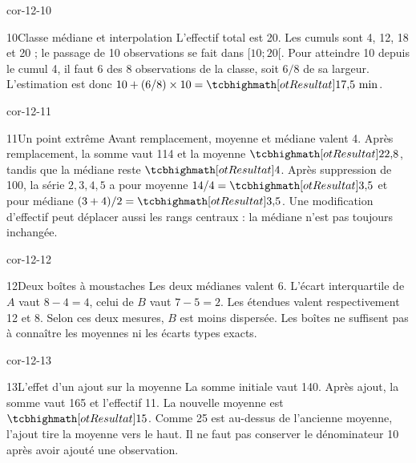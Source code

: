\begin{blocLivre}{cor-12-10}
\begin{corrige}{10}{Classe médiane et interpolation}
L’effectif total est 20. Les cumuls sont 4, 12, 18 et 20 ; le passage de 10 observations se fait dans $[10;20[$. Pour atteindre 10 depuis le cumul 4, il faut 6 des 8 observations de la classe, soit $6/8$ de sa largeur. L’estimation est donc $10+(6/8)\times10=\res{17{,}5\text{ min}}$.
\label{fig-cor-12-10}
\end{corrige}
\end{blocLivre}
\begin{blocLivre}{cor-12-11}
\begin{corrige}{11}{Un point extrême}
Avant remplacement, moyenne et médiane valent 4. Après remplacement, la somme vaut 114 et la moyenne $\res{22{,}8}$, tandis que la médiane reste $\res4$. Après suppression de 100, la série $2,3,4,5$ a pour moyenne $14/4=\res{3{,}5}$ et pour médiane $(3+4)/2=\res{3{,}5}$. Une modification d’effectif peut déplacer aussi les rangs centraux : la médiane n’est pas toujours inchangée.
\end{corrige}
\end{blocLivre}
\begin{blocLivre}{cor-12-12}
\begin{corrige}{12}{Deux boîtes à moustaches}
Les deux médianes valent 6. L’écart interquartile de $A$ vaut $8-4=4$, celui de $B$ vaut $7-5=2$. Les étendues valent respectivement 12 et 8. Selon ces deux mesures, $B$ est moins dispersée. Les boîtes ne suffisent pas à connaître les moyennes ni les écarts types exacts.
\label{fig-cor-12-12}
\end{corrige}
\end{blocLivre}
\begin{blocLivre}{cor-12-13}
\begin{corrige}{13}{L’effet d’un ajout sur la moyenne}
La somme initiale vaut 140. Après ajout, la somme vaut 165 et l’effectif 11. La nouvelle moyenne est $\res{15}$. Comme 25 est au-dessus de l’ancienne moyenne, l’ajout tire la moyenne vers le haut. Il ne faut pas conserver le dénominateur 10 après avoir ajouté une observation.
\end{corrige}
\end{blocLivre}
